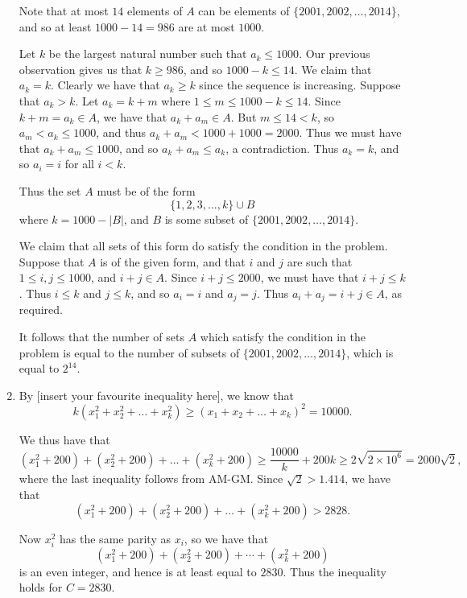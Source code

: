 \documentclass[12pt]{article}
\begin{document}
\begin{enumerate}
Note that at most $14$ elements of $A$ can be elements of $\{2001, 2002, \dots,
2014\}$, and so at least $1000 - 14 = 986$ are at most $1000$.

Let $k$ be the largest natural number such that $a_k \leq 1000$. Our previous
observation gives us that $k \geq 986$, and so $1000 - k \leq 14$. We claim
that $a_k = k$. Clearly we have that $a_k \geq k$ since the sequence is
increasing. Suppose that $a_k > k$. Let $a_k = k + m$ where $1 \leq m \leq 1000
- k \leq 14$. Since $k + m = a_k \in A$, we have that $a_k + a_m \in A$. But $m
\leq 14 < k$, so $a_m < a_k \leq 1000$, and thus $a_k + a_m < 1000 + 1000 =
2000$. Thus we must have that $a_k + a_m \leq 1000$, and so $a_k + a_m \leq
a_k$, a contradiction. Thus $a_k = k$, and so $a_i = i$ for all $i < k$.

Thus the set $A$ must be of the form
\[
    \{1, 2, 3, \dots, k\} \cup B  
\]
where $k = 1000 - |B|$, and $B$ is some subset of $\{2001, 2002, \dots, 2014\}$.

We claim that all sets of this form do satisfy the condition in the problem.
Suppose that $A$ is of the given form, and that $i$ and $j$ are such that $1
\leq i, j \leq 1000$, and $i + j \in A$. Since $i + j \leq 2000$, we must have
that $i + j \leq k$. Thus $i \leq k$ and $j \leq k$, and so $a_i = i$ and $a_j =
j$. Thus $a_i + a_j = i + j \in A$, as required.

It follows that the number of sets $A$ which satisfy the condition in the
problem is equal to the number of subsets of $\{2001, 2002, \dots, 2014\}$,
which is equal to $2^{14}$.


\item %
By [insert your favourite inequality here], we know that
\[
    k(x_1^2 + x_2^2 + \dots + x_k^2) \geq (x_1 + x_2 + \dots + x_k)^2 = 10000.
\]

We thus have that
\[
    (x_1^2 + 200) + (x_2^2 + 200) + \dots + (x_k^2 + 200) \geq \frac{10000}{k} +
    200k \geq 2 \sqrt{2 \times 10^6} = 2000 \sqrt{2},
\]
where the last inequality follows from AM-GM. Since $\sqrt{2} > 1.414$, we have
that
\[
    (x_1^2 + 200) + (x_2^2 + 200) + \dots + (x_k^2 + 200) > 2828.
\]

Now $x_i^2$ has the same parity as $x_i$, so we have that
\[
    (x_1^2 + 200) + (x_2^2 + 200) + \cdots + (x_k^2 + 200)  
\]
is an even integer, and hence is at least equal to $2830$. Thus the inequality
holds for $C = 2830$.


\end{enumerate}
\end{document}
